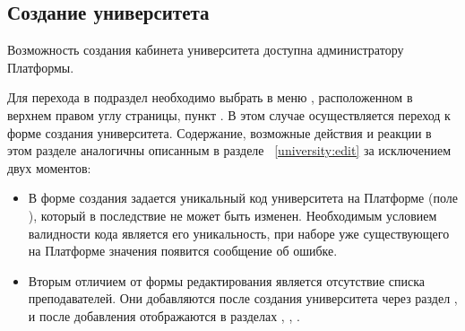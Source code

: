 \subsection{Создание университета}
Возможность создания кабинета университета доступна администратору Платформы. 

Для перехода в подраздел необходимо выбрать в меню , расположенном в верхнем правом углу страницы, пункт . В этом случае осуществляется переход к форме создания университета. Содержание, возможные действия и реакции в этом разделе аналогичны описанным в разделе ~\ref{university:edit} за исключением двух моментов:
\begin{itemize}
	\item В форме создания задается уникальный код университета на Платформе (поле ), который в последствие не может быть изменен. Необходимым условием валидности кода является его уникальность, при наборе уже существующего на Платформе значения появится сообщение об ошибке.
		
	\item Вторым отличием от формы редактирования является отсутствие списка преподавателей. Они добавляются после создания университета через раздел , и после добавления отображаются в разделах , , .
\end{itemize}
	
	

		

	
	
	
	
	
	